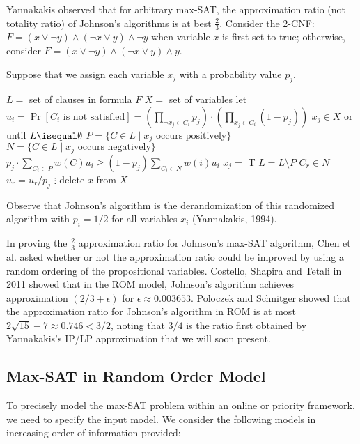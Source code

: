 Yannakakis observed that for arbitrary max-SAT, the approximation ratio (not totality ratio) of Johnson's algorithms is at best $\frac{2}{3}$. Consider the 2-CNF: $F = (x \lor \neg y) \land (\neg x \lor y) \land \neg y$ when variable $x$ is first set to true; otherwise, consider $F = (x \lor \neg y) \land (\neg x \lor y) \land y$.

Suppose that we assign each variable $x_j$ with a probability value $p_j$.
\begin{codebox}
    \li $L = $ set of clauses in formula $F$
    \li $X = $ set of variables
    \li let $u_i = \Pr[\text{$C_i$ is not satisfied}] = \left( \prod_{\neg x_j \in C_i} p_j \right) \cdot \left( \prod_{x_j \in C_i} (1-p_j) \right) $
    \li \For $x_j \in X$ or until $L \isequal \emptyset$ \Do
        \li $P = \{C \in L \mid \text{$x_j$ occurs positively}\}$
        \li $N = \{C \in L \mid \text{$x_j$ occurs negatively}\}$
        \li \If $p_j \cdot \sum_{C_i \in P} w(C) u_i \geq (1-p_j) \sum_{C_i \in N} w(i) u_i$ \Then
            \li $x_j = $ T
            \li $L = L \setminus P$
            \li \For $C_r \in N$ \Do
                \li $u_r = u_r / p_j$
            \End
            \li $\vdots$ 
        \End
        \li delete $x$ from $X$
    \End
\end{codebox}

Observe that Johnson's algorithm is the derandomization of this randomized algorithm with $p_i = 1/2$ for all variables $x_i$ (Yannakakis, 1994).

In proving the $\frac{2}{3}$ approximation ratio for Johnson's max-SAT algorithm, Chen et al. asked whether or not the approximation ratio could be improved by using a random ordering of the propositional variables. Costello, Shapira and Tetali in 2011 showed that in the ROM model, Johnson's algorithm achieves approximation $(2/3 + \epsilon)$ for $\epsilon \approx 0.003653$. Poloczek and Schnitger showed that the approximation ratio for Johnson's algorithm in ROM is at most $2\sqrt{15} - 7 \approx 0.746 < 3/2$, noting that $3/4$ is the ratio first obtained by Yannakakis's IP/LP approximation that we will soon present.

\subsection{Max-SAT in Random Order Model}

To precisely model the max-SAT problem within an online or priority framework, we need to specify the input model. We consider the following models in increasing order of information provided:

